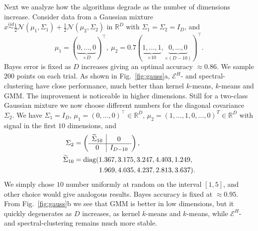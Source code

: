 \documentclass[twoside]{article}
\DeclareMathOperator{\diag}{diag}
\begin{document}
Next we analyze
how the algorithms degrade as the number of dimensions increase.
Consider data from a Gaussian mixture
$x  \stackrel{iid}{\sim} 
\tfrac{1}{2} \mathcal{N}(\mu_1,\Sigma_1) +
\tfrac{1}{2} \mathcal{N}(\mu_2,\Sigma_2)$ in $\mathbb{R}^D$ with
$\Sigma_1=\Sigma_2 = I_D$,  and
\begin{equation}
\label{eq:gauss1}
\mu_1 = (\underbrace{0,\dotsc,0}_{\times D})^\top, \
\mu_2 = 0.7 (\underbrace{1,\dots,1}_{\times 10},
\underbrace{0,\dots,0}_{\times (D-10)})^\top.
\end{equation}
Bayes error is fixed as $D$ increases giving an optimal accuracy
$\approx 0.86$.
We sample $200$ points on each trial.
As shown in Fig.~\ref{fig:gauss}a, 
$\mathcal{E}^H$- and spectral-clustering have close
performance,  
much better than kernel $k$-means, 
$k$-means and GMM. The improvement is noticeable in 
higher dimensions.
Still for a two-class Gaussian mixture we now choose
different numbers for the  diagonal covariance $\Sigma_2$.
We have $\Sigma_1=I_D$, $\mu_1=(0,\dotsc,0)^\top \in \mathbb{R}^D$,
$\mu_2=(1,\dotsc,1,0,\dotsc,0)^T \in \mathbb{R}^D$ 
with signal in the first $10$ dimensions, and
\begin{equation}
\label{eq:gauss2}
\begin{split}
\Sigma_2 &= \left( \begin{array}{c|c}
\widetilde{\Sigma}_{10} & 0 \\ \hline 
0 & I_{D-10} \end{array}\right), \\
\widetilde{\Sigma}_{10} &= \diag(1.367,  3.175,  3.247,  4.403,  1.249,\\
&\hspace{3.6em}1.969, 4.035,   4.237,  2.813,  3.637).
\end{split}
\end{equation}
We simply chose $10$ number uniformly at random on the interval
$[1,5]$, and other choice would give analogous results.
Bayes  accuracy is fixed at $\approx 0.95$.
From Fig.~\ref{fig:gauss}b we see that 
GMM is better in low dimensions, 
but it quickly degenerates
as $D$ increases, as kernel $k$-means and $k$-means, while  
$\mathcal{E}^H$- and spectral-clustering remains much more stable. 
\end{document}
